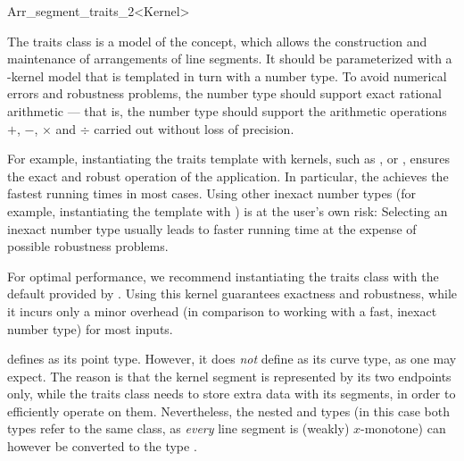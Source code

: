 
\ccRefPageBegin

\begin{ccRefClass}{Arr_segment_traits_2<Kernel>}
    
\ccDefinition 

The traits class \ccRefName{} is a model of the 
concept, which allows the construction and maintenance of arrangements of
line segments. It should be parameterized with a \cgal-kernel model that is
templated in turn with a number type. To avoid numerical errors and
robustness problems, the number type should support exact rational
arithmetic --- that is, the number type should support the arithmetic
operations $+$, $-$, $\times$ and $\div$ carried out without loss of
precision.

For example, instantiating the traits
template with kernels, such as ,
or , ensures the exact and robust operation of
the application. In particular, the  achieves
the fastest running times in most cases. Using other inexact number
types (for example, instantiating the template with
) is at the user's own risk:
Selecting an inexact number type usually leads to faster running time at
the expense of possible robustness problems.

For optimal performance, we recommend instantiating the traits class with
the default  provided by
\cgal. Using this kernel guarantees exactness and robustness, while it incurs
only a minor overhead (in comparison to working with a fast, inexact number
type) for most inputs.

\ccRefName{} defines  as its point type. However, it
does {\sl not} define  as its curve type, as one
may expect. The reason is that the kernel segment is represented by its
two endpoints only, while the traits class needs to store extra data
with its segments, in order to efficiently operate on them. Nevertheless,
the nested  and  types (in this
case both types refer to the same class, as {\sl every} line segment
is (weakly) $x$-monotone) can however be converted to the type
.


\end{ccRefClass}
